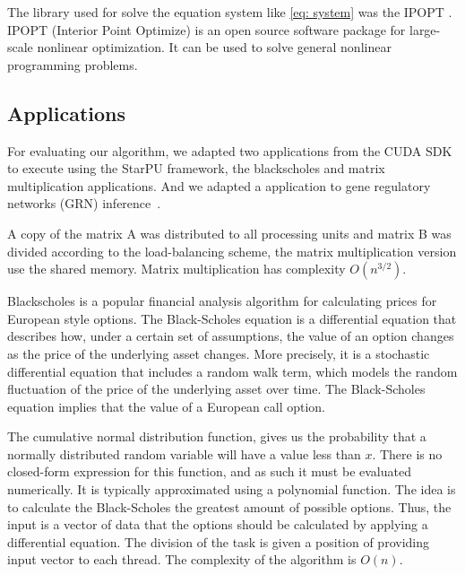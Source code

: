 \documentclass[journal]{IEEEtran}
\begin{document}
The library used for solve the equation system like \ref{eq: system} was the IPOPT \cite{point}. IPOPT (Interior Point Optimize) is an open source software package for large-scale nonlinear optimization. It can be used to solve general nonlinear programming problems.

\subsection{Applications}

For evaluating our algorithm, we adapted two applications from the CUDA
SDK~\cite{cuda} to execute using the StarPU framework, the blackscholes and matrix
multiplication applications. And we adapted a application to gene regulatory networks (GRN) inference~\cite{borelli2013gene}.

 A copy of the matrix A was distributed to all processing units and matrix B was divided according to
the load-balancing scheme, the matrix multiplication version use the shared memory. Matrix multiplication has complexity $O(n^{3/2})$.

Blackscholes is a popular financial analysis algorithm for calculating prices
for European style options. The Black-Scholes equation is a differential
equation that describes how, under a certain set of assumptions, the value of an
option changes as the price of the underlying asset changes. More precisely, it
is a stochastic differential equation that includes a random walk term, which
models the random fluctuation of the price of the underlying asset over time.
The Black-Scholes equation implies that the value of a European call option.


The cumulative normal distribution function, gives us the probability that a
normally distributed random variable will have a value less than $x$. There is no
closed-form expression for this function, and as such it must be evaluated
numerically. It is typically approximated using a polynomial function. The idea is to calculate the Black-Scholes the greatest amount of possible options. Thus, the input is a vector of data that the options should be calculated by applying a differential equation. The division of the task is given a position of providing input vector to each thread. The complexity of the algorithm is $O(n)$.
\end{document}
